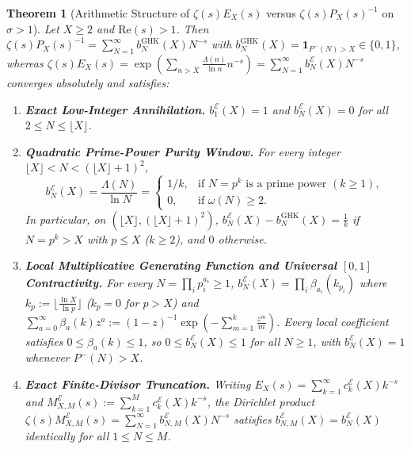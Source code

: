 \documentclass[11pt,reqno]{amsart}
\newtheorem{theorem}{Theorem}[section]
\theoremstyle{definition}
\theoremstyle{remark}
\numberwithin{equation}{section}
\newcommand{\Rea}{\mathrm{Re}}
\begin{document}
\begin{theorem}[Arithmetic Structure of $\zeta(s)E_X(s)$ versus $\zeta(s)P_X(s)^{-1}$ on $\sigma > 1$]\label{thm:purity_sigma_gt_1}
Let $X \ge 2$ and $\Rea(s) > 1$. Then $\zeta(s)P_X(s)^{-1} = \sum_{N=1}^{\infty} b_N^{\mathrm{GHK}}(X)N^{-s}$ with $b_N^{\mathrm{GHK}}(X) = \mathbf{1}_{P^-(N) > X} \in \{0,1\}$, whereas $\zeta(s)E_X(s) = \exp(\sum_{n > X} \frac{\Lambda(n)}{\ln n}n^{-s}) = \sum_{N=1}^{\infty} b_N^{\mathcal{E}}(X)N^{-s}$ converges absolutely and satisfies:
\begin{enumerate}[label=\textup{(\roman*)},leftmargin=2.2em]
\item \textbf{Exact Low-Integer Annihilation.} $b_1^{\mathcal{E}}(X) = 1$ and $b_N^{\mathcal{E}}(X) = 0$ for all $2 \le N \le \lfloor X\rfloor$.
\item \textbf{Quadratic Prime-Power Purity Window.} For every integer $\lfloor X\rfloor < N < (\lfloor X\rfloor + 1)^2$,
\begin{equation}\label{eq:prime_power_purity}
b_N^{\mathcal{E}}(X) = \frac{\Lambda(N)}{\ln N} = \begin{cases} 1/k, & \text{if } N = p^k \text{ is a prime power } (k \ge 1), \\ 0, & \text{if } \omega(N) \ge 2. \end{cases}
\end{equation}
In particular, on $(\lfloor X\rfloor, (\lfloor X\rfloor+1)^2)$, $b_N^{\mathcal{E}}(X) - b_N^{\mathrm{GHK}}(X) = \frac{1}{k}$ if $N = p^k > X$ with $p \le X$ ($k \ge 2$), and $0$ otherwise.
\item \textbf{Local Multiplicative Generating Function and Universal $[0,1]$ Contractivity.} For every $N = \prod_i p_i^{a_i} \ge 1$, $b_N^{\mathcal{E}}(X) = \prod_i \beta_{a_i}(k_{p_i})$ where $k_p := \lfloor\frac{\ln X}{\ln p}\rfloor$ ($k_p = 0$ for $p > X$) and $\sum_{a=0}^{\infty} \beta_a(k)z^a := (1-z)^{-1}\exp(-\sum_{m=1}^k \frac{z^m}{m})$. Every local coefficient satisfies $0 \le \beta_a(k) \le 1$, so $0 \le b_N^{\mathcal{E}}(X) \le 1$ for all $N \ge 1$, with $b_N^{\mathcal{E}}(X) = 1$ whenever $P^-(N) > X$.
\item \textbf{Exact Finite-Divisor Truncation.} Writing $E_X(s) = \sum_{k=1}^{\infty} c_k^{\mathcal{E}}(X)k^{-s}$ and $M_{X,M}^{\mathcal{E}}(s) := \sum_{k=1}^M c_k^{\mathcal{E}}(X)k^{-s}$, the Dirichlet product $\zeta(s)M_{X,M}^{\mathcal{E}}(s) = \sum_{N=1}^{\infty} b_{N,M}^{\mathcal{E}}(X)N^{-s}$ satisfies $b_{N,M}^{\mathcal{E}}(X) = b_N^{\mathcal{E}}(X)$ identically for all $1 \le N \le M$.
\end{enumerate}
\end{theorem}
\end{document}
